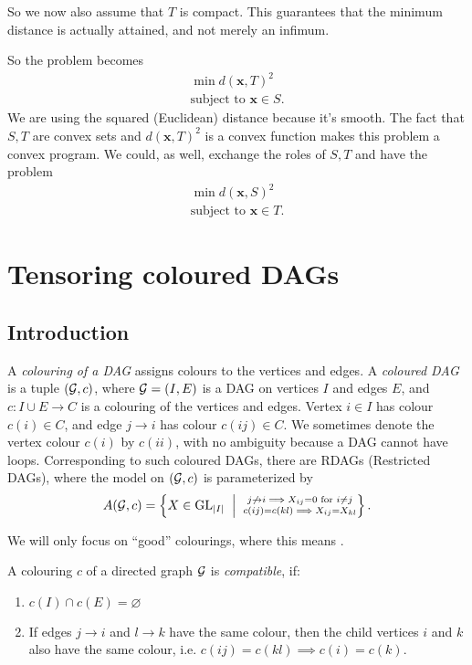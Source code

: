 So we now also assume that $T$ is compact. This guarantees that the minimum distance is actually attained, and not merely an infimum.

So the problem becomes 
\begin{align*}
\min d(\pmb x,T)^2\\
\text{subject to } \pmb x \in S.
\end{align*}
We are using the squared (Euclidean) distance because it's smooth.
The fact that $S,T$ are convex sets and $d(\pmb x,T)^2$ is a convex function makes this problem a convex program. We could, as well, exchange the roles of $S,T$ and have the problem 
\begin{align*}
\min d(\pmb x,S)^2\\
\text{subject to } \pmb x \in T.
\end{align*}




\section{Tensoring coloured DAGs}

\subsection{Introduction}

A \emph{colouring of a DAG} assigns colours to the vertices and edges. A \emph{coloured DAG} is a tuple $({\mathcal{G}},c)$, where ${\mathcal{G}} = (I,E)$ is a DAG on vertices $I$ and edges $E$, and $c:I\cup E\to C$ is a colouring of the vertices and edges. Vertex $i \in I$ has colour $c(i) \in C$, and edge $j \to i$ has colour $c(ij) \in C$. We sometimes denote the vertex colour $c(i)$ by $c(ii)$, with no ambiguity because a DAG cannot have loops. Corresponding to such coloured DAGs, there are RDAGs (Restricted DAGs), where the model on $({\mathcal{G}},c)$ is parameterized by $$A(\cG,c) = \set{X\in \GL_{\abs{I}} \st \substack{j\not\to i \implies X_{ij}=0 \text{ for } i\neq j\\c(ij) = c(kl)\implies X_{ij} = X_{kl}}}.$$

We will only focus on ``good'' colourings, where this means .
\begin{defn}
A colouring $c$ of a directed graph ${\mathcal{G}}$ is \emph{compatible}, if:
\begin{enumerate}[label=(\alph*),itemsep=0pt]
\item $c(I)\cap c(E) = \varnothing$
\item If edges $j \to i$ and $l \to k$ have the same colour, then the child vertices $i$ and $k$ also have the same colour, i.e. $c(ij) = c(kl) \implies c(i) = c(k)$.
\end{enumerate}
\end{defn}

